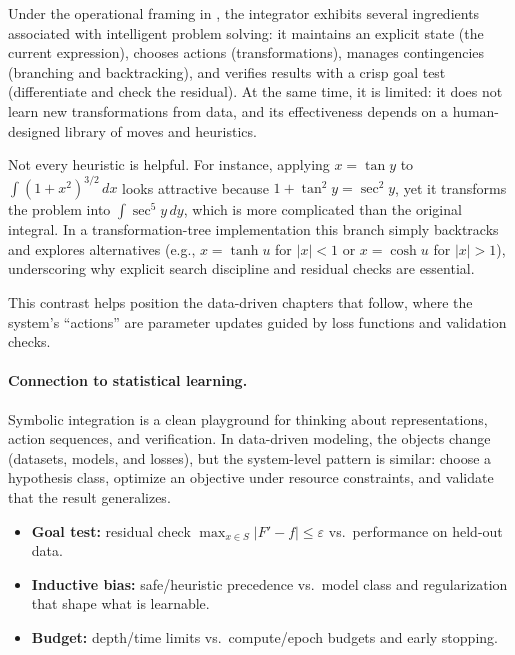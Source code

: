 Under the operational framing in , the integrator exhibits several ingredients associated with intelligent problem solving: it maintains an explicit state (the current expression), chooses actions (transformations), manages contingencies (branching and backtracking), and verifies results with a crisp goal test (differentiate and check the residual). At the same time, it is limited: it does not learn new transformations from data, and its effectiveness depends on a human-designed library of moves and heuristics.

Not every heuristic is helpful. For instance, applying \(x = \tan y\) to \(\int (1 + x^2)^{3/2} \, dx\) looks attractive because \(1+\tan^2 y = \sec^2 y\), yet it transforms the problem into \(\int \sec^5 y \, dy\), which is more complicated than the original integral. In a transformation-tree implementation this branch simply backtracks and explores alternatives (e.g., \(x = \tanh u\) for \(|x|<1\) or \(x=\cosh u\) for \(|x|>1\)), underscoring why explicit search discipline and residual checks are essential.

This contrast helps position the data-driven chapters that follow, where the system's ``actions'' are parameter updates guided by loss functions and validation checks.

\paragraph{Connection to statistical learning.} Symbolic integration is a clean playground for thinking about representations, action sequences, and verification. In data-driven modeling, the objects change (datasets, models, and losses), but the system-level pattern is similar: choose a hypothesis class, optimize an objective under resource constraints, and validate that the result generalizes.

\begin{tcolorbox}[summarybox, title={Connection: transformation search vs.\ empirical risk minimization}]
\begin{itemize}
    \item \textbf{Goal test:} residual check \(\max_{x\in S}|F'-f|\le\varepsilon\) vs.\ performance on held-out data.
    \item \textbf{Inductive bias:} safe/heuristic precedence vs.\ model class and regularization that shape what is learnable.
    \item \textbf{Budget:} depth/time limits vs.\ compute/epoch budgets and early stopping.
\end{itemize}
\end{tcolorbox}

